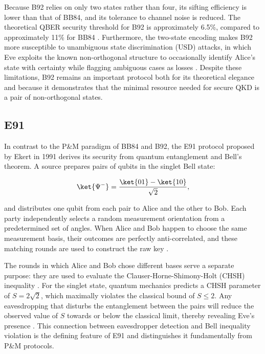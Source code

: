 Because B92 relies on only two states rather than four, its sifting efficiency is lower than that of BB84, and its tolerance to channel noise is reduced. The theoretical QBER security threshold for B92 is approximately 6.5\%, compared to approximately 11\% for BB84 \cite{ekertQI}. Furthermore, the two-state encoding makes B92 more susceptible to unambiguous state discrimination (USD) attacks, in which Eve exploits the known non-orthogonal structure to occasionally identify Alice's state with certainty while flagging ambiguous cases as losses \cite{B92}. Despite these limitations, B92 remains an important protocol both for its theoretical elegance and because it demonstrates that the minimal resource needed for secure QKD is a pair of non-orthogonal states.

\subsection{E91}
\label{sec:e91}

In contrast to the P\&M paradigm of BB84 and B92, the E91 protocol proposed by Ekert in 1991 \cite{E91} derives its security from quantum entanglement and Bell's theorem. A source prepares pairs of qubits in the singlet Bell state:

%
\begin{equation}
  \ket{\Psi^{-}} = \frac{\ket{01} - \ket{10}}{\sqrt{2}},
  \label{eq:e91-singlet}
\end{equation}
%

and distributes one qubit from each pair to Alice and the other to Bob. Each party independently selects a random measurement orientation from a predetermined set of angles. When Alice and Bob happen to choose the same measurement basis, their outcomes are perfectly anti-correlated, and these matching rounds are used to construct the raw key \cite{E91}.

The rounds in which Alice and Bob chose different bases serve a separate purpose: they are used to evaluate the Clauser-Horne-Shimony-Holt (CHSH) inequality \cite{QKDbible}. For the singlet state, quantum mechanics predicts a CHSH parameter of $S = 2\sqrt{2}$, which maximally violates the classical bound of $S \leq 2$. Any eavesdropping that disturbs the entanglement between the pairs will reduce the observed value of $S$ towards or below the classical limit, thereby revealing Eve's presence \cite{ekertQI, E91}. This connection between eavesdropper detection and Bell inequality violation is the defining feature of E91 and distinguishes it fundamentally from P\&M protocols.

